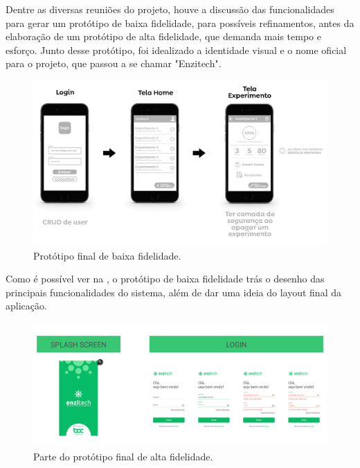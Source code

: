 Dentre as diversas reuniões do projeto, houve a discussão das funcionalidades para gerar um protótipo de baixa fidelidade, para possíveis refinamentos, antes da elaboração de um protótipo de alta fidelidade, que demanda mais tempo e esforço. Junto desse protótipo, foi idealizado a identidade visual e o nome oficial para o projeto, que passou a se chamar "Enzitech".

\begin{figure}[H]
\centering
  \includegraphics[width=\columnwidth]{images/prototipo_baixa.png}
  \caption{Protótipo final de baixa fidelidade.}
  \label{fig:prototipo_baixa}
\end{figure}

Como é possível ver na , o protótipo de baixa fidelidade trás o desenho das principais funcionalidades do sistema, além de dar uma ideia do layout final da aplicação.

\begin{figure}[H]
\centering
  \includegraphics[width=\columnwidth]{images/exemplo_prototipo_alta.png}
  \caption{Parte do protótipo final de alta fidelidade.}
  \label{fig:exemplo_prototipo_alta}
\end{figure}


